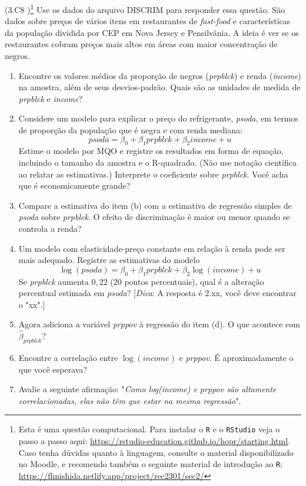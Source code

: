 \documentclass[12pt,letterpaper, onecolumn]{exam}
\begin{document}
\begin{questions}
\question\qstar (3.C8 \citep{wooldridge2016})\footnote{Esta é uma questão computacional. Para instalar o \texttt{R} e o \texttt{RStudio} veja o passo a passo aqui: \href{https://rstudio-education.github.io/hopr/starting.html}{https://rstudio-education.github.io/hopr/starting.html}. Caso tenha dúvidas quanto à linguagem, consulte o material disponibilizado no Moodle, e recomendo também o seguinte material de introdução ao \texttt{R}: \href{https://fhnishida.netlify.app/project/rec2301/sec2/}{https://fhnishida.netlify.app/project/rec2301/sec2/} }
Use os dados do arquivo DISCRIM para responder essa questão. São dados sobre preços de vários itens em restaurantes de \textit{fast-food} e características da população dividida por CEP em Nova Jersey e Pensilvânia. A ideia é ver se os restaurantes cobram preços mais altos em áreas com maior concentração de negros.
    \begin{enumerate} [label = (\alph*)]
\item Encontre os valores médios da proporção de negros (\textit{prpblck}) e renda (\textit{income}) na amostra, além de seus desvios-padrão. Quais são as unidades de medida de \textit{prpblck} e \textit{income}?
\item Considere um modelo para explicar o preço do refrigerante, \textit{psoda}, em termos de proporção da população que é negra e com renda mediana: \begin{equation*}
    psoda = \beta_0 + \beta_1prpblck + \beta_2income + u
\end{equation*} Estime o modelo por MQO e registre os resultados em forma de equação, incluindo o tamanho da amostra e o R-quadrado. (Não use notação científica ao relatar as estimativas.) Interprete o coeficiente sobre \textit{prpblck}. Você acha que é economicamente grande?
\item Compare a estimativa do item (b) com a estimativa de regressão simples de \textit{psoda} sobre \textit{prpblck}. O efeito de discriminação é maior ou menor quando se controla a renda?
\item Um modelo com elasticidade-preço constante em relação à renda pode ser mais adequado. Registre as estimativas do modelo\begin{equation*}
    \log(psoda) = \beta_0 + \beta_1prpblck + \beta_2\log(income) + u
\end{equation*} Se \textit{prpblck} aumenta $0,22$ (20 pontos percentuais), qual é a alteração percentual estimada em \textit{psoda}? [\textit{Dica}: A resposta é 2.xx, você deve encontrar o "xx".]
\item Agora adiciona a variável \textit{prppov} à regressão do item (d). O que acontece com $\hat\beta_{prpblck}$?
\item Encontre a correlação entre $\log(income)$ e \textit{prppov}. É aproximadamente o que você esperava?
\item Avalie a seguinte afirmação: "\textit{Como log(income) e prppov são altamente correlacionadas, elas não têm que estar na mesma regressão}".
    \end{enumerate}
    
\end{questions}
\newpage

\end{document}
